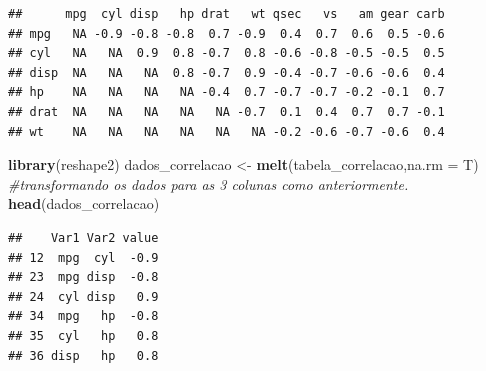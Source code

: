 \documentclass[
]{book}
\newenvironment{Shaded}{\begin{snugshade}}{\end{snugshade}}
\newcommand{\CommentTok}[1]{\textcolor[rgb]{0.56,0.35,0.01}{\textit{#1}}}
\newcommand{\DataTypeTok}[1]{\textcolor[rgb]{0.13,0.29,0.53}{#1}}
\newcommand{\KeywordTok}[1]{\textcolor[rgb]{0.13,0.29,0.53}{\textbf{#1}}}
\newcommand{\NormalTok}[1]{#1}
\newcommand{\StringTok}[1]{\textcolor[rgb]{0.31,0.60,0.02}{#1}}
\begin{document}
\begin{verbatim}
##      mpg  cyl disp   hp drat   wt qsec   vs   am gear carb
## mpg   NA -0.9 -0.8 -0.8  0.7 -0.9  0.4  0.7  0.6  0.5 -0.6
## cyl   NA   NA  0.9  0.8 -0.7  0.8 -0.6 -0.8 -0.5 -0.5  0.5
## disp  NA   NA   NA  0.8 -0.7  0.9 -0.4 -0.7 -0.6 -0.6  0.4
## hp    NA   NA   NA   NA -0.4  0.7 -0.7 -0.7 -0.2 -0.1  0.7
## drat  NA   NA   NA   NA   NA -0.7  0.1  0.4  0.7  0.7 -0.1
## wt    NA   NA   NA   NA   NA   NA -0.2 -0.6 -0.7 -0.6  0.4
\end{verbatim}

\begin{Shaded}
\begin{Highlighting}[]
\KeywordTok{library}\NormalTok{(reshape2)}
\NormalTok{dados_correlacao <-}\StringTok{ }\KeywordTok{melt}\NormalTok{(tabela_correlacao,}\DataTypeTok{na.rm =}\NormalTok{ T) }\CommentTok{#transformando os dados para as 3 colunas como anteriormente.}
\KeywordTok{head}\NormalTok{(dados_correlacao)}
\end{Highlighting}
\end{Shaded}

\begin{verbatim}
##    Var1 Var2 value
## 12  mpg  cyl  -0.9
## 23  mpg disp  -0.8
## 24  cyl disp   0.9
## 34  mpg   hp  -0.8
## 35  cyl   hp   0.8
## 36 disp   hp   0.8
\end{verbatim}
\end{document}
